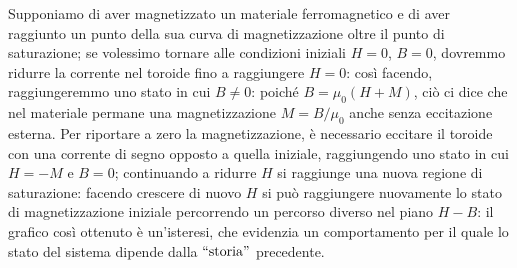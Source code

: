 \documentclass[]{article}
\begin{document}
%
Supponiamo di aver magnetizzato un materiale ferromagnetico e di aver raggiunto un punto della sua curva di magnetizzazione oltre il punto di saturazione; se volessimo tornare alle condizioni iniziali $ H = 0 $, $ B = 0 $, dovremmo ridurre la corrente nel toroide fino a raggiungere $ H = 0 $: così facendo, raggiungeremmo uno stato in cui $ B \neq 0 $: poiché $ B = \mu_0 (H + M) $, ciò ci dice che nel materiale permane una magnetizzazione $ M = B / \mu_0 $ anche senza eccitazione esterna. Per riportare a zero la magnetizzazione, è necessario eccitare il toroide con una corrente di segno opposto a quella iniziale, raggiungendo uno stato in cui $ H = - M $ e $ B = 0 $; continuando a ridurre $ H $ si raggiunge una nuova regione di saturazione: facendo crescere di nuovo $ H $ si può raggiungere nuovamente lo stato di magnetizzazione iniziale percorrendo un percorso diverso nel piano $ H - B $: il grafico così ottenuto è un'isteresi, che evidenzia un comportamento per il quale lo stato del sistema dipende dalla $ ``\text{storia}" $ precedente.
\end{document}
